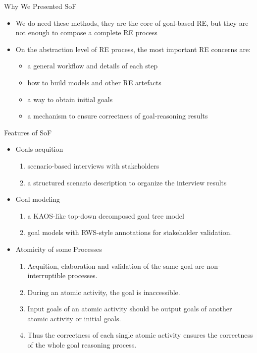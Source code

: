 \documentclass{beamer}
\begin{document}
\begin{frame}{Why We Presented SoF}          %
  \begin{itemize}
  \item We do need these methods, they are the core of goal-based RE, but they are not enough to compose a complete RE process\pause
  \item 
    On the abstraction level of RE process, the most important RE concerns are: \pause
    \begin{itemize}
    \item a general workflow and details of each step \pause
    \item how to build models and other RE artefacts \pause
    \item a way to obtain initial goals \pause
    \item a mechanism to ensure correctness of goal-reasoning results \pause
    \end{itemize}
  \end{itemize}
\end{frame}

\begin{frame}{Features of SoF}             %
  \begin{itemize}
  \item Goals acquition \pause
    \begin{enumerate}
    \item scenario-based interviews with stakeholders \pause
    \item a structured scenario description to organize the interview results \pause
    \end{enumerate}
  \item Goal modeling  \pause
    \begin{enumerate}
    \item a KAOS-like top-down decomposed goal tree model  \pause
    \item goal models with RWS-style annotations for stakeholder validation. \pause
    \end{enumerate}
  \item Atomicity of some Processes \pause
    \begin{enumerate}
    \item Acquition, elaboration and validation of the same goal are non-interruptible processes. \pause
    \item During an atomic activity, the goal is inaccessible. \pause
    \item Input goals of an atomic activity should be output goals of another atomic activity or initial goals.\pause
    \item Thus the correctness of each single atomic activity ensures the correctness of the whole goal reasoning process.
    \end{enumerate}
  \end{itemize}
\end{frame}
\end{document}
